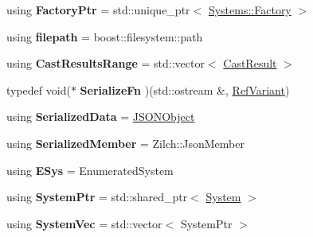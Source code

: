 \begin{DoxyCompactItemize}
\item 
\hypertarget{namespaceDCEngine_ae40eb71c9cc7bae29eddae6cbdda70de}{using {\bfseries Factory\-Ptr} = std\-::unique\-\_\-ptr$<$ \hyperlink{classDCEngine_1_1Systems_1_1Factory}{Systems\-::\-Factory} $>$}\label{namespaceDCEngine_ae40eb71c9cc7bae29eddae6cbdda70de}

\item 
\hypertarget{namespaceDCEngine_a063d2e816e54d840d6f61061c0499ef7}{using {\bfseries filepath} = boost\-::filesystem\-::path}\label{namespaceDCEngine_a063d2e816e54d840d6f61061c0499ef7}

\item 
\hypertarget{namespaceDCEngine_a28587c1e648189a674740273020f723d}{using {\bfseries Cast\-Results\-Range} = std\-::vector$<$ \hyperlink{structDCEngine_1_1CastResult}{Cast\-Result} $>$}\label{namespaceDCEngine_a28587c1e648189a674740273020f723d}

\item 
\hypertarget{namespaceDCEngine_a3c2b6c803011b04b6caf39aa836916a0}{typedef void($\ast$ {\bfseries Serialize\-Fn} )(std\-::ostream \&, \hyperlink{classDCEngine_1_1RefVariant}{Ref\-Variant})}\label{namespaceDCEngine_a3c2b6c803011b04b6caf39aa836916a0}

\item 
\hypertarget{namespaceDCEngine_a6f9fa45b47ba545847dce453b9b5c5b5}{using {\bfseries Serialized\-Data} = \hyperlink{classDCEngine_1_1JSONObject}{J\-S\-O\-N\-Object}}\label{namespaceDCEngine_a6f9fa45b47ba545847dce453b9b5c5b5}

\item 
\hypertarget{namespaceDCEngine_a982ad8b48b014d194a9bfdd4dd75a6f1}{using {\bfseries Serialized\-Member} = Zilch\-::\-Json\-Member}\label{namespaceDCEngine_a982ad8b48b014d194a9bfdd4dd75a6f1}

\item 
\hypertarget{namespaceDCEngine_a396ae49846fea65f7a97616600233c5e}{using {\bfseries E\-Sys} = Enumerated\-System}\label{namespaceDCEngine_a396ae49846fea65f7a97616600233c5e}

\item 
\hypertarget{namespaceDCEngine_a768b682449db5128155afda362871943}{using {\bfseries System\-Ptr} = std\-::shared\-\_\-ptr$<$ \hyperlink{classDCEngine_1_1System}{System} $>$}\label{namespaceDCEngine_a768b682449db5128155afda362871943}

\item 
\hypertarget{namespaceDCEngine_a285425049f043057862000e2a3cdeead}{using {\bfseries System\-Vec} = std\-::vector$<$ System\-Ptr $>$}\label{namespaceDCEngine_a285425049f043057862000e2a3cdeead}

\end{DoxyCompactItemize}
